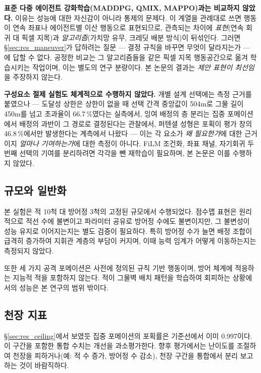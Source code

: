 \textbf{표준 다중 에이전트 강화학습(MADDPG, QMIX, MAPPO)과는 비교하지 않았다.} 이유는
성능에 대한 자신감이 아니라 통제의 문제다. 이 계열을 관례대로 쓰면 행동이 연속 좌표나
에이전트별 이산 행동으로 표현되므로, 관측되는 차이에 \emph{표현}(연속 회귀 대 픽셀 지목)과
\emph{알고리즘}(가치망 유무, 크레딧 배분 방식)이 뒤섞인다. 그러면 \S\ref{sec:res_maneuver}가
답하려는 질문 --- 결정 규칙을 바꾸면 무엇이 달라지는가 --- 에 답할 수 없다. 공정한 비교는
그 알고리즘들을 같은 픽셀 지목 행동공간으로 옮겨 학습시키는 작업이며, 이는 별도의 연구
분량이다. 본 논문의 결과는 \emph{제안 표현이 최선임}을 주장하지 않는다.

\textbf{구성요소 절제 실험도 체계적으로 수행하지 않았다.} 개별 설계 선택에는 측정 근거를
붙였으나 --- 도달성 상한은 상한이 없을 때 선택 간격 중앙값이 504\unit{m}로 그물 길이
450\unit{m}를 넘고 초과율이 66.7\,\%였다는 실측에서, 잉여 배정의 층 분리는 집중 포메이션에서
배정의 과반이 그 경로로 결정된다는 관찰에서, 퍼텐셜 성형은 포획이 평가 창의 46.8\,\%에서만
발생한다는 계측에서 나왔다 --- 이는 각 요소가 \emph{왜 필요한가}에 대한 근거이지 \emph{얼마나
기여하는가}에 대한 측정이 아니다. FiLM 조건화, 좌표 채널, 자기회귀 두 번째 선택의 기여를
분리하려면 각각을 뺀 재학습이 필요하며, 본 논문은 이를 수행하지 않았다.

\subsection{규모와 일반화}

본 실험은 적 10척 대 방어정 3척의 고정된 규모에서 수행되었다. 점수맵 표현은 원리적으로 적선
수에 불변이고 파라미터 공유로 방어정 수에도 불변이지만, 그 불변성이 성능 유지로 이어지는지는
별도 검증이 필요하다. 특히 방어정 수가 늘면 배정 조합이 급격히 증가하여 지휘관 계층의 부담이
커지며, 이때 능력 임계가 어떻게 이동하는지는 측정되지 않았다.

또한 세 가지 공격 포메이션은 사전에 정의된 규칙 기반 행동이며, 방어 체계에 적응하는 지능적
적을 포함하지 않는다. 적이 그물벽 배치 패턴을 학습하여 회피하는 상황에서의 성능은 본 연구의
범위 밖이다.

\subsection{천장 지표}

\S\ref{sec:res_ceiling}에서 보였듯 집중 포메이션의 포획률은 기준선에서 이미 0.997이다. 이
구간을 포함한 통합 수치는 개선을 과소평가한다. 향후 평가에서는 난이도를 조절하여 천장을
피하거나(예: 적 수 증가, 방어정 수 감소), 천장 구간을 통합에서 분리 보고하는 것이 바람직하다.
